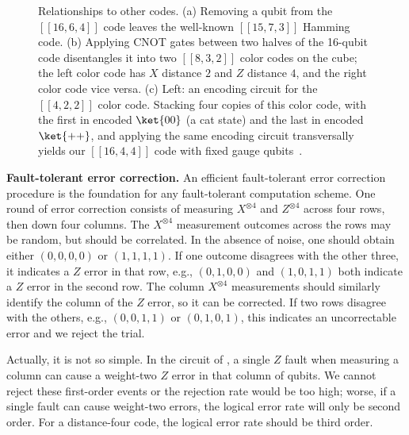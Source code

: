 \documentclass[10pt, twocolumn, aps, nofootinbib, longbibliography, nobibnotes, superscriptaddress]{revtex4-1} %
\begin{document}
\begin{figure}
\caption{Relationships to other codes.  (a) Removing a qubit from the $[[16,6,4]]$ code leaves the well-known $[[15,7,3]]$ Hamming code.  (b) Applying CNOT gates between two halves of the 16-qubit code disentangles it into two $[[8,3,2]]$ color codes on the cube; the left color code has $X$ distance $2$ and $Z$ distance $4$, and the right color code vice versa.  (c) Left: an encoding circuit for the $[[4,2,2]]$ color code.  Stacking four copies of this color code, with the first in encoded $\ket{00}$ (a cat state) and the last in encoded $\ket{{+}{+}}$, and applying the same encoding circuit transversally yields our $[[16,4,4]]$ code with fixed gauge qubits~\cite{BreuckmannBurton22foldtransversalclifford}.}
\label{f:code_relationships}
\end{figure}

\medskip
\noindent
\textbf{Fault-tolerant error correction.}
An efficient fault-tolerant error correction procedure is the foundation for any fault-tolerant computation scheme.  One round of error correction consists of measuring $X^{\otimes 4}$ and $Z^{\otimes 4}$ across four rows, then down four columns.  The $X^{\otimes 4}$ measurement outcomes across the rows may be random, but should be correlated.  In the absence of noise, one should obtain either $(0,0,0,0)$ or $(1,1,1,1)$.  If one outcome disagrees with the other three, it indicates a $Z$ error in that row, e.g., $(0,1,0,0)$ and $(1,0,1,1)$ both indicate a $Z$ error in the second row.  The column $X^{\otimes 4}$ measurements should similarly identify the column of the $Z$ error, so it can be corrected.  If two rows disagree with the others, e.g., $(0,0,1,1)$ or $(0,1,0,1)$, this indicates an uncorrectable error and we reject the trial.  

Actually, it is not so simple.  In the circuit of , a single $Z$ fault when measuring a column can cause a weight-two $Z$ error in that column of qubits.  We cannot reject these first-order events or the rejection rate would be too high; worse, if a single fault can cause weight-two errors, the logical error rate will only be second order.  For a distance-four code, the logical error rate should be third order.  
\end{document}
